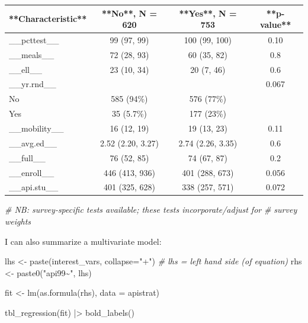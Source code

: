\documentclass[
]{book}
\newenvironment{Shaded}{\begin{snugshade}}{\end{snugshade}}
\newcommand{\AttributeTok}[1]{\textcolor[rgb]{0.77,0.63,0.00}{#1}}
\newcommand{\CommentTok}[1]{\textcolor[rgb]{0.56,0.35,0.01}{\textit{#1}}}
\newcommand{\FunctionTok}[1]{\textcolor[rgb]{0.00,0.00,0.00}{#1}}
\newcommand{\NormalTok}[1]{#1}
\newcommand{\OtherTok}[1]{\textcolor[rgb]{0.56,0.35,0.01}{#1}}
\newcommand{\SpecialCharTok}[1]{\textcolor[rgb]{0.00,0.00,0.00}{#1}}
\newcommand{\StringTok}[1]{\textcolor[rgb]{0.31,0.60,0.02}{#1}}
\begin{document}
\begin{tabular}{l|c|c|c}
\hline
**Characteristic** & **No**, N = 620 & **Yes**, N = 753 & **p-value**\\
\hline
\_\_pcttest\_\_ & 99 (97, 99) & 100 (99, 100) & 0.10\\
\hline
\_\_meals\_\_ & 72 (28, 93) & 60 (35, 82) & 0.8\\
\hline
\_\_ell\_\_ & 23 (10, 34) & 20 (7, 46) & 0.6\\
\hline
\_\_yr.rnd\_\_ &  &  & 0.067\\
\hline
No & 585 (94\%) & 576 (77\%) & \\
\hline
Yes & 35 (5.7\%) & 177 (23\%) & \\
\hline
\_\_mobility\_\_ & 16 (12, 19) & 19 (13, 23) & 0.11\\
\hline
\_\_avg.ed\_\_ & 2.52 (2.20, 3.27) & 2.74 (2.26, 3.35) & 0.6\\
\hline
\_\_full\_\_ & 76 (52, 85) & 74 (67, 87) & 0.2\\
\hline
\_\_enroll\_\_ & 446 (413, 936) & 401 (288, 673) & 0.056\\
\hline
\_\_api.stu\_\_ & 401 (325, 628) & 338 (257, 571) & 0.072\\
\hline
\end{tabular}

\begin{Shaded}
\begin{Highlighting}[]
  \CommentTok{\# NB: survey{-}specific tests available; these tests incorporate/adjust for }
  \CommentTok{\#   survey weights }
\end{Highlighting}
\end{Shaded}

I can also summarize a multivariate model:

\begin{Shaded}
\begin{Highlighting}[]
\NormalTok{lhs }\OtherTok{\textless{}{-}} \FunctionTok{paste}\NormalTok{(interest\_vars, }\AttributeTok{collapse=}\StringTok{"+"}\NormalTok{) }\CommentTok{\# lhs = left hand side (of equation)}
\NormalTok{rhs }\OtherTok{\textless{}{-}} \FunctionTok{paste0}\NormalTok{(}\StringTok{"api99\textasciitilde{}"}\NormalTok{, lhs)}

\NormalTok{fit }\OtherTok{\textless{}{-}} \FunctionTok{lm}\NormalTok{(}\FunctionTok{as.formula}\NormalTok{(rhs),}
          \AttributeTok{data =}\NormalTok{ apistrat)}

\FunctionTok{tbl\_regression}\NormalTok{(fit) }\SpecialCharTok{|\textgreater{}} \FunctionTok{bold\_labels}\NormalTok{()}
\end{Highlighting}
\end{Shaded}
\end{document}
